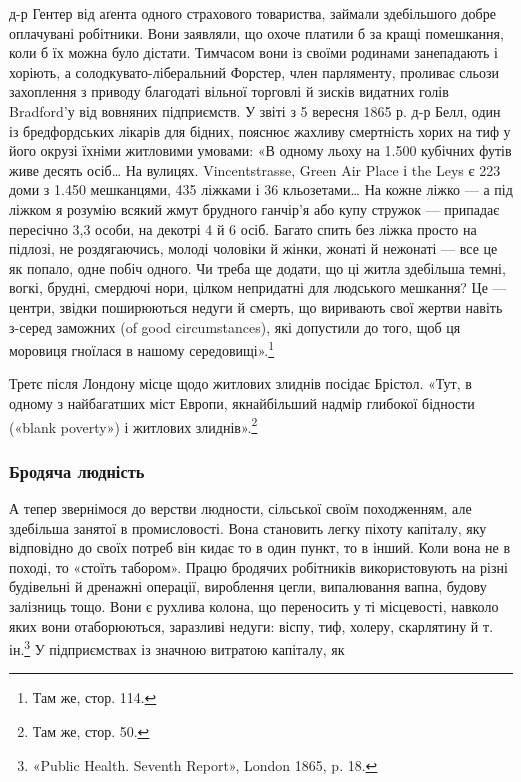 д-р Гентер від аґента одного страхового товариства, займали
здебільшого добре оплачувані робітники. Вони заявляли, що
охоче платили б за кращі помешкання, коли б їх можна було
дістати. Тимчасом вони із своїми родинами занепадають і хоріють,
а солодкувато-ліберальний Форстер, член парляменту, проливає
сльози захоплення з приводу благодаті вільної торговлі й зисків
видатних голів Bradford’у від вовняних підприємств. У звіті
з 5 вересня 1865 р. д-р Белл, один із бредфордських лікарів для
бідних, пояснює жахливу смертність хорих на тиф у його окрузі
їхніми житловими умовами: «В одному льоху на \num{1.500} кубічних
футів живе десять осіб\dots{} На вулицях. Vincentstrasse, Green
Air Place і the Leys є 223 доми з \num{1.450} мешканцями, 435 ліжками
і 36 кльозетами\dots{} На кожне ліжко — а під ліжком я розумію
всякий жмут брудного ганчір’я або купу стружок — припадає
пересічно 3,3 особи, на декотрі 4 й 6 осіб. Багато спить без ліжка
просто на підлозі, не роздягаючись, молоді чоловіки й жінки,
жонаті й нежонаті — все це як попало, одне побіч одного. Чи
треба ще додати, що ці житла здебільша темні, вогкі, брудні,
смердючі нори, цілком непридатні для людського мешкання?
Це — центри, звідки поширюються недуги й смерть, що виривають
свої жертви навіть з-серед заможних (of good circumstances),
які допустили до того, щоб ця моровиця гноїлася в нашому
середовищі».\footnote{
Там же, стор. 114.
}

Третє після Лондону місце щодо житлових злиднів посідає
Брістол. «Тут, в одному з найбагатших міст Европи, якнайбільший
надмір глибокої бідности («blank poverty») і житлових
злиднів».\footnote{
Там же, стор. 50.
}

\subsubsection{Бродяча людність}

А тепер звернімося до верстви людности, сільської своїм походженням,
але здебільша занятої в промисловості. Вона становить
легку піхоту капіталу, яку відповідно до своїх потреб
він кидає то в один пункт, то в інший. Коли вона не в поході,
то «стоїть табором». Працю бродячих робітників використовують
на різні будівельні й дренажні операції, вироблення цегли,
випалювання вапна, будову залізниць тощо. Вони є рухлива
колона, що переносить у ті місцевості, навколо яких вони отаборюються,
заразливі недуги: віспу, тиф, холеру, скарлятину
й т. ін.\footnote{
«Public Health. Seventh Report», London 1865, p. 18.
} У підприємствах із значною витратою капіталу, як
\parbreak{}  %
